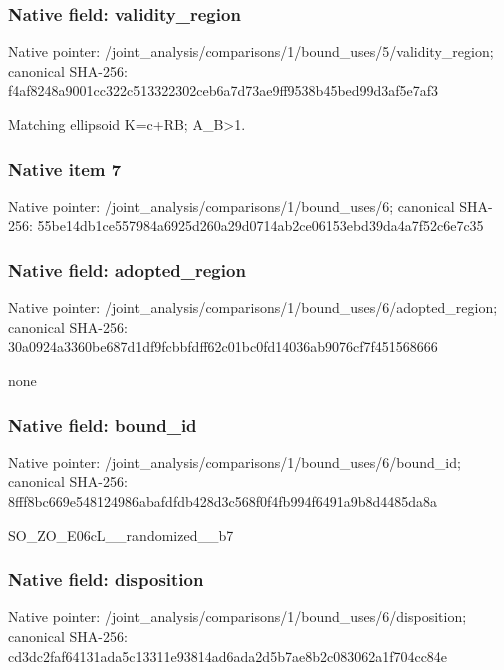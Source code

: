 \documentclass[10pt,a4paper]{article}
\begin{document}
\subsubsection{Native field: validity\_region}


Native pointer: /joint\_analysis/comparis\allowbreak{}ons/1/bound\_uses/5/valid\allowbreak{}ity\_region; canonical SHA-256: f4af8248a9001cc322c51332\allowbreak{}2302ceb6a7d73ae9ff9538b4\allowbreak{}5bed99d3af5e7af3


Matching ellipsoid K=c+RB; A\_B>1.


\subsubsection{Native item 7}


Native pointer: /joint\_analysis/comparis\allowbreak{}ons/1/bound\_uses/6; canonical SHA-256: 55be14db1ce557984a6925d2\allowbreak{}60a29d0714ab2ce06153ebd3\allowbreak{}9da4a7f52c6e7c35



\subsubsection{Native field: adopted\_region}


Native pointer: /joint\_analysis/comparis\allowbreak{}ons/1/bound\_uses/6/adopt\allowbreak{}ed\_region; canonical SHA-256: 30a0924a3360be687d1df9fc\allowbreak{}bbfdff62c01bc0fd14036ab9\allowbreak{}076cf7f451568666


none


\subsubsection{Native field: bound\_id}


Native pointer: /joint\_analysis/comparis\allowbreak{}ons/1/bound\_uses/6/bound\allowbreak{}\_id; canonical SHA-256: 8fff8bc669e548124986abaf\allowbreak{}dfdb428d3c568f0f4fb994f6\allowbreak{}491a9b8d4485da8a


SO\_ZO\_E06cL\_\_randomized\_\_b7


\subsubsection{Native field: disposition}


Native pointer: /joint\_analysis/comparis\allowbreak{}ons/1/bound\_uses/6/dispo\allowbreak{}sition; canonical SHA-256: cd3dc2faf64131ada5c13311\allowbreak{}e93814ad6ada2d5b7ae8b2c0\allowbreak{}83062a1f704cc84e
\end{document}
